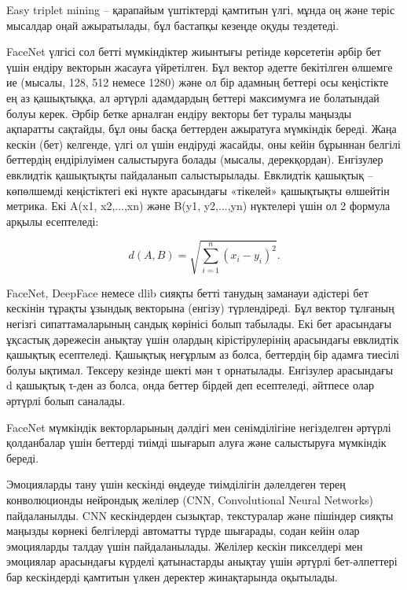 \begin{multicols}{2}
Easy triplet mining -- қарапайым үштіктерді қамтитын үлгі, мұнда оң және
теріс мысалдар оңай ажыратылады, бұл бастапқы кезеңде оқуды тездетеді.

FaceNet үлгісі сол бетті мүмкіндіктер жиынтығы ретінде көрсететін әрбір
бет үшін ендіру векторын жасауға үйретілген. Бұл вектор әдетте
бекітілген өлшемге ие (мысалы, 128, 512 немесе 1280) және ол бір адамның
беттері осы кеңістікте ең аз қашықтыққа, ал әртүрлі адамдардың беттері
максимумға ие болатындай болуы керек. Әрбір бетке арналған ендіру
векторы бет туралы маңызды ақпаратты сақтайды, бұл оны басқа беттерден
ажыратуға мүмкіндік береді. Жаңа кескін (бет) келгенде, үлгі ол үшін
ендіруді жасайды, оны кейін бұрыннан белгілі беттердің ендірілуімен
салыстыруға болады (мысалы, дерекқордан). Енгізулер евклидтік қашықтықты
пайдаланып салыстырылады. Евклидтік қашықтық -- көпөлшемді кеңістіктегі
екі нүкте арасындағы «тікелей» қашықтықты өлшейтін метрика. Екі A(x1,
x2,...,xn) және B(y1, y2,...,yn) нүктелері үшін ол 2 формула арқылы
есептеледі:

\begin{equation}
d(A,B) = \sqrt{\sum_{i = 1}^{n}\left( x_{i} - y_{i} \right)^{2}}.
\end{equation}

FaceNet, DeepFace немесе dlib сияқты бетті танудың заманауи әдістері бет
кескінін тұрақты ұзындық векторына (енгізу) түрлендіреді. Бұл вектор
тұлғаның негізгі сипаттамаларының сандық көрінісі болып табылады. Екі
бет арасындағы ұқсастық дәрежесін анықтау үшін олардың кірістірулерінің
арасындағы евклидтік қашықтық есептеледі. Қашықтық неғұрлым аз болса,
беттердің бір адамға тиесілі болуы ықтимал. Тексеру кезінде шекті мән τ
орнатылады. Енгізулер арасындағы d қашықтық τ-ден аз болса, онда беттер
бірдей деп есептеледі, әйтпесе олар әртүрлі болып саналады.

FaceNet мүмкіндік векторларының дәлдігі мен сенімділігіне негізделген
әртүрлі қолданбалар үшін беттерді тиімді шығарып алуға және салыстыруға
мүмкіндік береді.

Эмоцияларды тану үшін кескінді өңдеуде тиімділігін дәлелдеген терең
конволюционды нейрондық желілер (CNN, Convolutional Neural Networks)
пайдаланылды. CNN кескіндерден сызықтар, текстуралар және пішіндер
сияқты маңызды көрнекі белгілерді автоматты түрде шығарады, содан кейін
олар эмоцияларды талдау үшін пайдаланылады. Желілер кескін пикселдері
мен эмоциялар арасындағы күрделі қатынастарды анықтау үшін әртүрлі
бет-әлпеттері бар кескіндерді қамтитын үлкен деректер жинақтарында
оқытылады.


\end{multicols}
